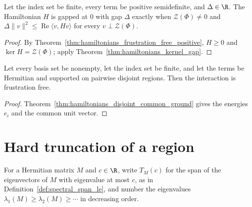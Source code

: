 \begin{theorem}
    \label{thm:hamiltonians_frustration_free_gap}
    \leanok
    Let the index set be finite, every term be positive semidefinite, and
    $\Delta\in\R$. The Hamiltonian $H$ is gapped at $0$ with gap $\Delta$ exactly
    when $\mathcal Z(\Phi)\neq0$ and
    $\Delta\lVert v\rVert^2\le\operatorname{Re}\langle v,Hv\rangle$ for every
    $v\perp\mathcal Z(\Phi)$.
\end{theorem}
\begin{proof}\leanok
    By Theorem~\ref{thm:hamiltonians_frustration_free_positive}, $H\ge0$ and
    $\ker H=\mathcal Z(\Phi)$; apply Theorem~\ref{thm:hamiltonians_kernel_gap}.
\end{proof}

\begin{theorem}
    \label{thm:hamiltonians_frustration_free_disjoint}
    \leanok
    Let every basis set be nonempty, let the index set be finite, and let the terms
    be Hermitian and supported on pairwise disjoint regions. Then the interaction is
    frustration free.
\end{theorem}
\begin{proof}\leanok
    Theorem~\ref{thm:hamiltonians_disjoint_common_ground} gives the energies $e_i$
    and the common unit vector.
\end{proof}

\section{Hard truncation of a region}
\label{sec:hamiltonians_hard_truncation}

For a Hermitian matrix $M$ and $c\in\R$, write $T_M(c)$ for the span of the
eigenvectors of $M$ with eigenvalue at most $c$, as in
Definition~\ref{def:spectral_span_le}, and number the eigenvalues
$\lambda_1(M)\ge\lambda_2(M)\ge\cdots$ in decreasing order.

